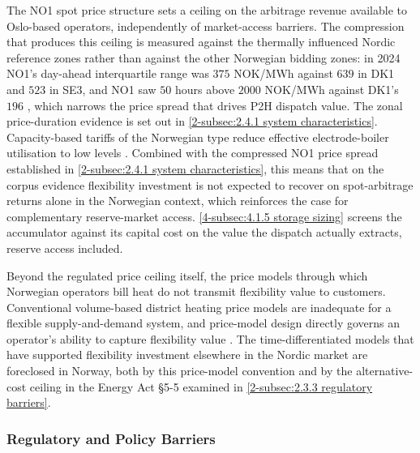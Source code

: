 The NO1 spot price structure sets a ceiling on the arbitrage revenue available to Oslo-based operators, independently of market-access barriers. The compression that produces this ceiling is measured against the thermally influenced Nordic reference zones rather than against the other Norwegian bidding zones: in 2024 NO1's day-ahead interquartile range was $375$ NOK/MWh against $639$ in DK1 and $523$ in SE3, and NO1 saw $50$ hours above $2000$ NOK/MWh against DK1's $196$ \cite{nord_pool_nord_nodate}, which narrows the price spread that drives P2H dispatch value. The zonal price-duration evidence is set out in \autoref{2-subsec:2.4.1 system characteristics}. Capacity-based tariffs of the Norwegian type reduce effective electrode-boiler utilisation to low levels \cite{sandberg_energy_2019}. Combined with the compressed NO1 price spread established in \autoref{2-subsec:2.4.1 system characteristics}, this means that on the corpus evidence flexibility investment is not expected to recover on spot-arbitrage returns alone in the Norwegian context, which reinforces the case for complementary reserve-market access. \autoref{4-subsec:4.1.5 storage sizing} screens the accumulator against its capital cost on the value the dispatch actually extracts, reserve access included.

Beyond the regulated price ceiling itself, the price models through which Norwegian operators bill heat do not transmit flexibility value to customers. Conventional volume-based district heating price models are inadequate for a flexible supply-and-demand system, and price-model design directly governs an operator's ability to capture flexibility value \cite{lygnerud_capturing_2024}. The time-differentiated models that have supported flexibility investment elsewhere in the Nordic market are foreclosed in Norway, both by this price-model convention and by the alternative-cost ceiling in the Energy Act §5-5 examined in \autoref{2-subsec:2.3.3 regulatory barriers}.


\subsubsection{Regulatory and Policy Barriers}
\label{2-subsec:2.3.3 regulatory barriers}

